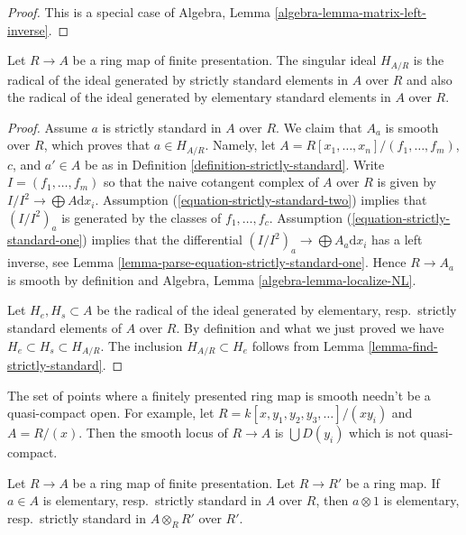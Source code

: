 \begin{proof}
This is a special case of
Algebra, Lemma \ref{algebra-lemma-matrix-left-inverse}.
\end{proof}

\begin{lemma}[Elkik]
\label{lemma-elkik}
Let $R \to A$ be a ring map of finite presentation.
The singular ideal $H_{A/R}$ is the radical of the ideal
generated by strictly standard elements in $A$ over $R$
and also the radical of the ideal generated by elementary
standard elements in $A$ over $R$.
\end{lemma}

\begin{proof}
Assume $a$ is strictly standard in $A$ over $R$. We claim that
$A_a$ is smooth over $R$, which proves that $a \in H_{A/R}$. Namely,
let $A = R[x_1, \ldots, x_n]/(f_1, \ldots, f_m)$, $c$, and $a' \in A$
be as in Definition \ref{definition-strictly-standard}.
Write $I = (f_1, \ldots, f_m)$ so that the naive cotangent
complex of $A$ over $R$ is given by $I/I^2 \to \bigoplus A\text{d}x_i$.
Assumption (\ref{equation-strictly-standard-two})
implies that $(I/I^2)_a$ is generated by the classes of $f_1, \ldots, f_c$.
Assumption (\ref{equation-strictly-standard-one}) implies
that the differential $(I/I^2)_a \to \bigoplus A_a\text{d}x_i$
has a left inverse, see
Lemma \ref{lemma-parse-equation-strictly-standard-one}.
Hence $R \to A_a$ is smooth by definition and
Algebra, Lemma \ref{algebra-lemma-localize-NL}.

\medskip\noindent
Let $H_e, H_s \subset A$ be the radical of the ideal generated by
elementary, resp.\ strictly standard elements of $A$ over $R$.
By definition and what we just proved we have
$H_e \subset H_s \subset H_{A/R}$. The inclusion $H_{A/R} \subset H_e$
follows from Lemma \ref{lemma-find-strictly-standard}.
\end{proof}

\begin{example}
\label{example-not-quasi-compact}
The set of points where a finitely presented ring map is smooth
needn't be a quasi-compact open. For example, let
$R = k[x, y_1, y_2, y_3, \ldots]/(xy_i)$ and $A = R/(x)$.
Then the smooth locus of $R \to A$ is
$\bigcup D(y_i)$ which is not quasi-compact.
\end{example}

\begin{lemma}
\label{lemma-strictly-standard-base-change}
Let $R \to A$ be a ring map of finite presentation.
Let $R \to R'$ be a ring map. If $a \in A$ is elementary,
resp.\ strictly standard in $A$ over $R$, then $a \otimes 1$
is elementary, resp.\ strictly standard in $A \otimes_R R'$ over $R'$.
\end{lemma}

